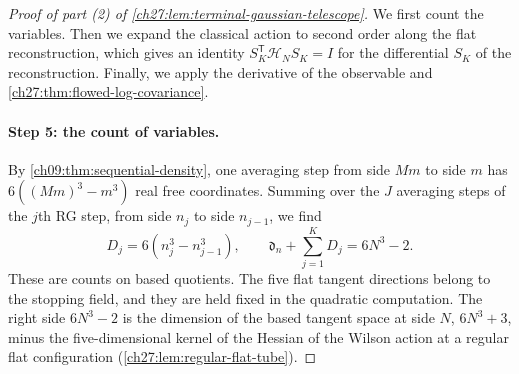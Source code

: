 \begin{proof}[Proof of part (2) of \cref{ch27:lem:terminal-gaussian-telescope}]
We first count the variables. Then we expand the classical action to second order along the flat reconstruction, which gives an identity $S_K^{\mathsf T}\mathcal H_NS_K=I$ for the differential $S_K$ of the reconstruction. Finally, we apply the derivative of the observable and \cref{ch27:thm:flowed-log-covariance}.

\paragraph{Step 5: the count of variables.}
By \cref{ch09:thm:sequential-density}, one averaging step from side $Mm$ to side $m$ has $6((Mm)^3-m^3)$ real free coordinates. Summing over the $J$ averaging steps of the $j$th RG step, from side $n_j$ to side $n_{j-1}$, we find
\begin{equation}\label{ch27:eq:gaussian-dimension-count}
 D_j=6(n_j^3-n_{j-1}^3),\qquad\mathfrak d_n+\sum_{j=1}^KD_j=6N^3-2.
\end{equation}
These are counts on based quotients. The five flat tangent directions belong to the stopping field, and they are held fixed in the quadratic computation. The right side $6N^3-2$ is the dimension of the based tangent space at side $N$, $6N^3+3$, minus the five-dimensional kernel of the Hessian of the Wilson action at a regular flat configuration (\cref{ch27:lem:regular-flat-tube}).


\end{proof}
